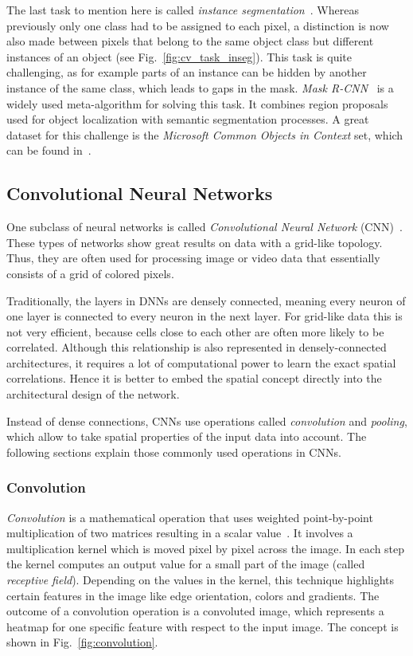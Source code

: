 The last task to mention here is called \emph{instance segmentation}~\cite{mask-rcnn14}. Whereas previously only one class had to be assigned to each pixel, a distinction is now also made between pixels that belong to the same object class but different instances of an object (see Fig.~\ref{fig:cv_task_inseg}). This task is quite challenging, as for example parts of an instance can be hidden by another instance of the same class, which leads to gaps in the mask. \emph{Mask R-CNN}~\cite{mask-rcnn14} is a widely used meta-algorithm for solving this task. It combines region proposals used for object localization with semantic segmentation processes. A great dataset for this challenge is the \emph{Microsoft Common Objects in Context} set, which can be found in~\cite{coco15}.

\subsection{Convolutional Neural Networks}
\label{sec:cnn}

One subclass of neural networks is called \emph{Convolutional Neural Network} (CNN)~\cite[p.~359]{praxiseinstieg_ml17}. These types of networks show great results on data with a grid-like topology. Thus, they are often used for processing image or video data that essentially consists of a grid of colored pixels.

Traditionally, the layers in DNNs are densely connected, meaning every neuron of one layer is connected to every neuron in the next layer. For grid-like data this is not very efficient, because cells close to each other are often more likely to be correlated. Although this relationship is also represented in densely-connected architectures, it requires a lot of computational power to learn the exact spatial correlations. Hence it is better to embed the spatial concept directly into the architectural design of the network.

Instead of dense connections, CNNs use operations called \emph{convolution} and \emph{pooling}, which allow to take spatial properties of the input data into account. The following sections explain those commonly used operations in CNNs.

\subsubsection{Convolution}
\label{sec:convolution}
\emph{Convolution} is a mathematical operation that uses weighted point-by-point multiplication of two matrices resulting in a scalar value~\cite[p.~361 f]{praxiseinstieg_ml17}. It involves a multiplication kernel which is moved pixel by pixel across the image. In each step the kernel computes an output value for a small part of the image (called \emph{receptive field}). Depending on the values in the kernel, this technique highlights certain features in the image like edge orientation, colors and gradients. The outcome of a convolution operation is a convoluted image, which represents a heatmap for one specific feature with respect to the input image. The concept is shown in Fig.~\ref{fig:convolution}.

